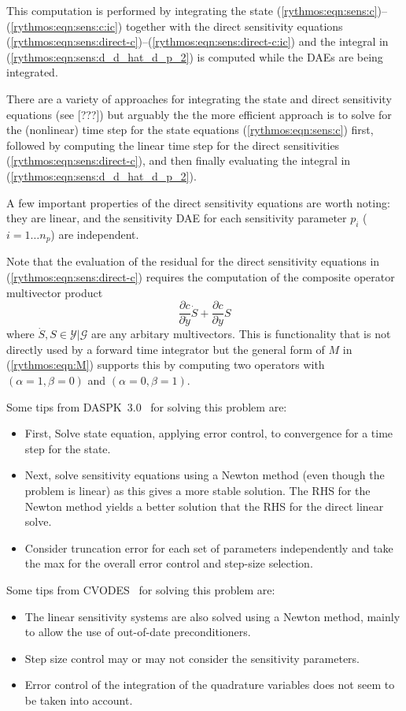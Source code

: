 \documentclass[pdf,ps2pdf,11pt]{SANDreport}
\begin{document}
This computation is performed by integrating the state
(\ref{rythmos:eqn:sens:c})--(\ref{rythmos:eqn:sens:c:ic}) together with the
direct sensitivity equations
(\ref{rythmos:eqn:sens:direct-c})--(\ref{rythmos:eqn:sens:direct-c:ic}) and
the integral in (\ref{rythmos:eqn:sens:d_d_hat_d_p_2}) is computed while the
DAEs are being integrated.

There are a variety of approaches for integrating the state and direct
sensitivity equations (see [???]) but arguably the the more efficient approach
is to solve for the (nonlinear) time step for the state equations
(\ref{rythmos:eqn:sens:c}) first, followed by computing the linear time step
for the direct sensitivities (\ref{rythmos:eqn:sens:direct-c}), and then
finally evaluating the integral in (\ref{rythmos:eqn:sens:d_d_hat_d_p_2}).

A few important properties of the direct sensitivity equations are worth
noting: they are linear, and the sensitivity DAE for each sensitivity
parameter $p_i$ ($i=1\ldots{}n_p$) are independent.

Note that the evaluation of the residual for the direct sensitivity equations
in (\ref{rythmos:eqn:sens:direct-c}) requires the computation of the composite
operator multivector product
%
\[
\frac{\partial c}{\partial \dot{y}} \dot{S} + \frac{\partial c}{\partial y} S
\]
%
where $\dot{S}, S {}\in\mathcal{Y}|\mathcal{G}$ are any arbitary multivectors.
This is functionality that is not directly used by a forward time integrator
but the general form of $M$ in (\ref{rythmos:eqn:M}) supports this by
computing two operators with $(\alpha=1,\beta=0)$ and $(\alpha=0,\beta=1)$.

Some tips from DASPK~3.0~\cite{new-daspk} for solving this problem are:
\begin{itemize}
%
{}\item First, Solve state equation, applying error control, to convergence for a
time step for the state.
%
{}\item Next, solve sensitivity equations using a Newton method (even though the problem
is linear) as this gives a more stable solution.  The RHS for the Newton method yields
a better solution that the RHS for the direct linear solve.
%
{}\item Consider truncation error for each set of parameters independently and take
the max for the overall error control and step-size selection.
%
\end{itemize}

Some tips from CVODES~\cite{cvodes} for solving this problem are:
\begin{itemize}
%
{}\item The linear sensitivity systems are also solved using a Newton method,
mainly to allow the use of out-of-date preconditioners.
%
{}\item Step size control may or may not consider the sensitivity parameters.
%
{}\item Error control of the integration of the quadrature variables does
not seem to be taken into account.
%
\end{itemize}
\end{document}
